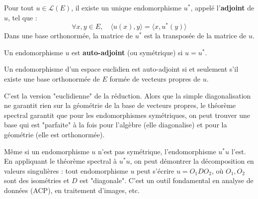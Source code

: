 \begin{proposition}
    Pour tout $u \in \mathcal{L}(E)$, il existe un unique endomorphisme $u^*$, appelé l'\textbf{adjoint} de $u$, tel que :
    $$ \forall x,y \in E, \quad \langle u(x), y \rangle = \langle x, u^*(y) \rangle $$
    Dans une base orthonormée, la matrice de $u^*$ est la transposée de la matrice de $u$.
\end{proposition}

\begin{definition}
    Un endomorphisme $u$ est \textbf{auto-adjoint} (ou symétrique) si $u=u^*$.
\end{definition}

\begin{theorem}
    Un endomorphisme d'un espace euclidien est auto-adjoint si et seulement s'il existe une base orthonormée de $E$ formée de vecteurs propres de $u$.
\end{theorem}
\begin{remark}
    C'est la version "euclidienne" de la réduction. Alors que la simple diagonalisation ne garantit rien sur la géométrie de la base de vecteurs propres, le théorème spectral garantit que pour les endomorphismes symétriques, on peut trouver une base qui est "parfaite" à la fois pour l'algèbre (elle diagonalise) et pour la géométrie (elle est orthonormée).
\end{remark}

\begin{application}
    Même si un endomorphisme $u$ n'est pas symétrique, l'endomorphisme $u^*u$ l'est. En appliquant le théorème spectral à $u^*u$, on peut démontrer la décomposition en valeurs singulières : tout endomorphisme $u$ peut s'écrire $u = O_1 D O_2$, où $O_1, O_2$ sont des isométries et $D$ est "diagonale". C'est un outil fondamental en analyse de données (ACP), en traitement d'images, etc.
\end{application}
